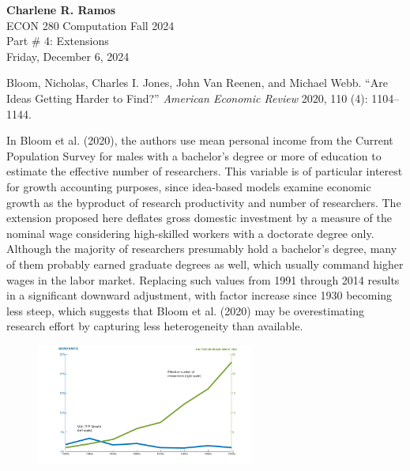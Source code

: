 \documentclass[11pt]{amsart}
\begin{document}
\noindent
{\textbf{\color{blue}Charlene R. Ramos}}\\
ECON 280 Computation Fall 2024\\
Part \# 4: Extensions\\
Friday, December 6, 2024\\

\smallskip 

\noindent Bloom, Nicholas, Charles I. Jones, John Van Reenen, and Michael Webb. ``Are Ideas Getting Harder to Find?'' \emph{American Economic Review} 2020, 110 (4): 1104–1144.\\ 


\smallskip

\noindent In Bloom et al. (2020), the authors use mean personal income from the Current Population Survey for males with a bachelor's degree or more of education to estimate the effective number of researchers. This variable is of particular interest for growth accounting purposes, since idea-based models examine economic growth as the byproduct of research productivity and number of researchers. The extension proposed here deflates gross domestic investment by a measure of the nominal wage considering high-skilled workers with a doctorate degree only. Although the majority of researchers presumably hold a bachelor's degree, many of them probably earned graduate degrees as well, which usually command higher wages in the labor market. Replacing such values from 1991 through 2014 results in a significant downward adjustment, with factor increase since 1930 becoming less steep, which suggests that Bloom et al. (2020) may be overestimating research effort by capturing less heterogeneity than available.

\bigskip


\smallskip

\begin{figure}[h]
    \centering 
    \includegraphics[width=0.64\textwidth]{factor.png}  
    \label{fig:histogram} 
\end{figure}
\end{document}
